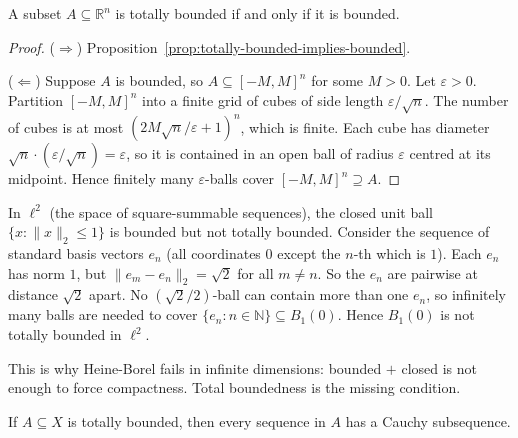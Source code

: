 
\begin{proposition}
\label{prop:totally-bounded-Rn}
A subset $A \subseteq \mathbb{R}^n$ is totally bounded if and only if
it is bounded.
\end{proposition}

\begin{proof}
($\Rightarrow$) Proposition~\ref{prop:totally-bounded-implies-bounded}.

($\Leftarrow$) Suppose $A$ is bounded, so $A \subseteq [-M, M]^n$ for
some $M > 0$.
Let $\varepsilon > 0$.
Partition $[-M, M]^n$ into a finite grid of cubes of side length
$\varepsilon / \sqrt{n}$.
The number of cubes is at most $(2M\sqrt{n}/\varepsilon + 1)^n$, which is finite.
Each cube has diameter $\sqrt{n} \cdot (\varepsilon/\sqrt{n}) = \varepsilon$,
so it is contained in an open ball of radius $\varepsilon$ centred at its midpoint.
Hence finitely many $\varepsilon$-balls cover $[-M,M]^n \supseteq A$.
\end{proof}

\begin{remark*}
In $\ell^2$ (the space of square-summable sequences), the closed unit ball
$\{x : \|x\|_2 \le 1\}$ is bounded but not totally bounded.
Consider the sequence of standard basis vectors $e_n$
(all coordinates $0$ except the $n$-th which is $1$).
Each $e_n$ has norm $1$, but $\|e_m - e_n\|_2 = \sqrt{2}$ for all $m \neq n$.
So the $e_n$ are pairwise at distance $\sqrt{2}$ apart.
No $(\sqrt{2}/2)$-ball can contain more than one $e_n$,
so infinitely many balls are needed to cover $\{e_n : n \in \mathbb{N}\}
\subseteq B_1(0)$.
Hence $B_1(0)$ is not totally bounded in $\ell^2$.

This is why Heine-Borel fails in infinite dimensions: bounded $+$ closed
is not enough to force compactness.
Total boundedness is the missing condition.
\end{remark*}


\begin{proposition}
\label{prop:totally-bounded-Cauchy}
If $A \subseteq X$ is totally bounded, then every sequence in $A$ has
a Cauchy subsequence.
\end{proposition}

